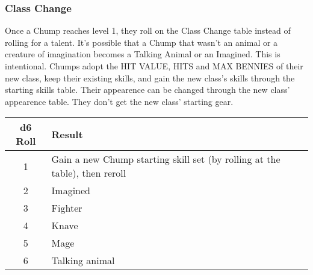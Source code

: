 \begin{multicols}{2}
\subsubsection*{Class Change}
Once a Chump reaches level 1, they roll on the Class Change table instead of rolling for a talent. It's possible that a Chump that wasn't an animal or a creature of imagination becomes a Talking Animal or an Imagined. This is intentional. Chumps adopt the HIT VALUE, HITS and MAX BENNIES of their new class, keep their existing skills, and gain the new class's skills through the starting skills table. Their appearence can be changed through the new class' appearence table. They don't get the new class' starting gear.

\end{multicols}

\begin{table}[b!]
\centering
\begin{tabular}{|c|l|}
\hline
\textbf{d6 Roll} & \textbf{Result} \\
\hline
1 & Gain a new Chump starting skill set (by rolling at the table), then reroll \\
2 & Imagined \\
3 & Fighter \\
4 & Knave \\
5 & Mage \\
6 & Talking animal \\
\hline
\end{tabular}
\end{table}
